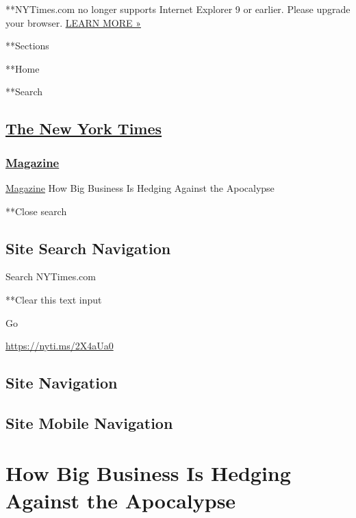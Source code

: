  **NYTimes.com no longer supports Internet Explorer 9 or earlier. Please
upgrade your browser.
\href{http://www.nytimes3xbfgragh.onion/content/help/site/ie9-support.html}{LEARN
MORE »}

**Sections

**Home

**Search

\hypertarget{the-new-york-times}{%
\subsection{\texorpdfstring{\href{http://www.nytimes3xbfgragh.onion/}{The
New York Times}}{The New York Times}}\label{the-new-york-times}}

\hypertarget{-magazine-}{%
\subsubsection{\texorpdfstring{
\href{https://www.nytimes3xbfgragh.onion/section/magazine}{Magazine}
}{ Magazine }}\label{-magazine-}}

 \href{https://www.nytimes3xbfgragh.onion/section/magazine}{Magazine}
\textbar{}How Big Business Is Hedging Against the Apocalypse

**Close search

\hypertarget{site-search-navigation}{%
\subsection{Site Search Navigation}\label{site-search-navigation}}

Search NYTimes.com

**Clear this text input

Go

\url{https://nyti.ms/2X4aUa0}

\hypertarget{site-navigation}{%
\subsection{Site Navigation}\label{site-navigation}}

\hypertarget{site-mobile-navigation}{%
\subsection{Site Mobile Navigation}\label{site-mobile-navigation}}

\hypertarget{how-big-business-is-hedging-against-the-apocalypse}{%
\section{How Big Business Is Hedging Against the
Apocalypse}\label{how-big-business-is-hedging-against-the-apocalypse}}

